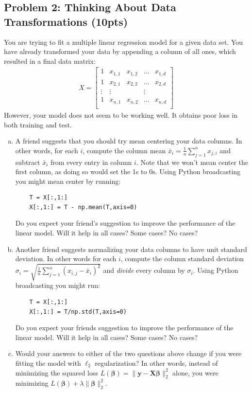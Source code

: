 \documentclass[10pt]{article}
\newcommand{\bs}[1]{\boldsymbol{#1}}
\newcommand{\bv}[1]{\mathbf{#1}}
\begin{document}
\subsection{Problem 2: Thinking About Data Transformations (10pts)}
You are trying to fit a multiple linear regression model for a given data set. You have already transformed your data by appending a column of all ones, which resulted in a final data matrix:
\begin{align*}
X = \begin{bmatrix}
1 & x_{1,1} & x_{1,2} & \ldots & x_{1,d} \\
1 & x_{2,1} & x_{2,2} & \ldots & x_{2,d} \\
\vdots & \vdots & & \vdots\\
1 & x_{n,1} & x_{n,2} & \ldots & x_{n,d} \\
\end{bmatrix}
\end{align*}
However, your model does not seem to be working well. It obtains poor loss in both training and test. 
\begin{enumerate}[(a)]
	\item A friend suggests that you should try mean centering your data columns. In other words, for each $i$, compute the column mean $\bar{x}_i = \frac{1}{n}\sum_{j=1}^n x_{j,i}$ and subtract $\bar{x}_i$ from every entry in column $i$. Note that we won't mean center the first column, as doing so would set the 1s to 0s.
	Using Python broadcasting you might mean center by running:
	\begin{lstlisting}
	T = X[:,1:]
	X[:,1:] = T - np.mean(T,axis=0)
	\end{lstlisting}
	Do you expect your friend's suggestion to improve the performance of the linear model. Will it help in all cases? Some cases? No cases?
	
	\item Another friend suggests normalizing your data columns to have unit standard deviation. In other words for each $i$, compute the column standard deviation $\sigma_i = \sqrt{\frac{1}{n}\sum_{j=1}^n (x_{i,j} - \bar{x}_i)^2}$ and \emph{divide} every column by $\sigma_i$. 
	Using Python broadcasting you might run:
	\begin{lstlisting}
	T = X[:,1:]
	X[:,1:] = T/np.std(T,axis=0)
	\end{lstlisting}
	Do you expect your friends suggestion to improve the performance of the linear model. Will it help in all cases? Some cases? No cases?
	
	\item Would your answers to either of the two questions above change if you were fitting the model with $\ell_2$ regularization? In other words, instead of minimizing the squared loss $L(\bs{\beta}) = \|\bv{y} - \bv{X}\bs{\beta}\|_2^2$ alone, you were minimizing $L(\bs{\beta}) + \lambda\|\bs{\beta}\|_2^2$. 

\end{enumerate}
\end{document}
